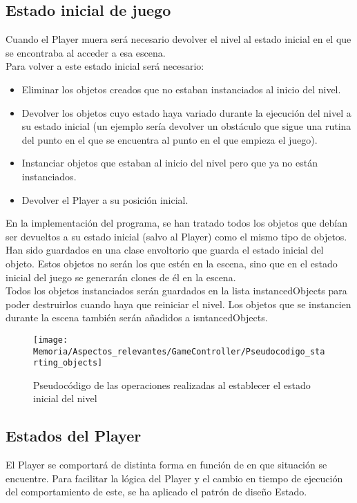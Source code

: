 \subsection{Estado inicial de juego}
Cuando el Player muera será necesario devolver el nivel al estado inicial en el que se encontraba al acceder a esa escena.\\
Para volver a este estado inicial será necesario:
\begin{itemize}
\item
Eliminar los objetos creados que no estaban instanciados al inicio del nivel.
\item
Devolver los objetos cuyo estado haya variado durante la ejecución del nivel a su estado inicial (un ejemplo sería devolver un obstáculo que sigue una rutina del punto en el que se encuentra al punto en el que empieza el juego).
\item
Instanciar objetos que estaban al inicio del nivel pero que ya no están instanciados.
\item
Devolver el Player a su posición inicial.
\end{itemize}

En la implementación del programa, se han tratado todos los objetos que debían ser devueltos a su estado inicial (salvo al Player) como el mismo tipo de objetos. Han sido guardados en una clase envoltorio que guarda el estado inicial del objeto. Estos objetos no serán los que estén en la escena, sino que en el estado inicial del juego se generarán clones de él en la escena.\\
Todos los objetos instanciados serán guardados en la lista instancedObjects para poder destruirlos cuando haya que reiniciar el nivel. Los objetos que se instancien durante la escena también serán añadidos a isntancedObjects.

\clearpage
\begin{figure}[h]
\texttt{[image: Memoria/Aspectos\_relevantes/GameController/Pseudocodigo\_starting\_objects]}
\caption{Pseudocódigo de las operaciones realizadas al establecer el estado inicial del nivel}
\end{figure}

\subsection{Estados del Player}
El Player se comportará de distinta forma en función de en que situación se encuentre. Para facilitar la lógica del Player y el cambio en tiempo de ejecución del comportamiento de este, se ha aplicado el patrón de diseño Estado.

